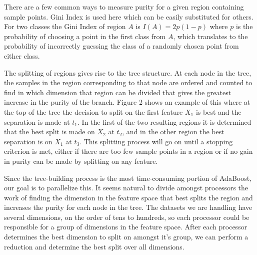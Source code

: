 \documentclass[12pt]{article}
\begin{document}
There are a few common ways to measure purity for a given region containing
sample points. Gini Index is used here which can be easily substituted for
others. For two classes the Gini Index of region $A$ is $I(A) = 2p(1-p)$ where
$p$ is the probability of choosing a point in the first class from $A$, which
translates to the probability of incorrectly guessing the class of a randomly
chosen point from either class.

The splitting of regions gives rise to the tree structure. At each node in the
tree, the samples in the region corresponding to that node are ordered and
counted to find in which dimension that region can be divided that gives the
greatest increase in the purity of the branch. Figure 2 shows an example of
this where at the top of the tree the decision to split on the first feature
$X_1$ is best and the separation is made at $t_1$. In the first of the two
resulting regions it is determined that the best split is made on $X_2$ at
$t_2$, and in the other region the best separation is on $X_1$ at $t_3$. This
splitting process will go on until a stopping criterion is met, either if there
are too few sample points in a region or if no gain in purity can be made by
splitting on any feature.


Since the tree-building process is the most time-consuming portion of AdaBoost,
our goal is to parallelize this. It seems natural to divide amongst processors
the work of finding the dimension in the feature space that best splits the
region and increases the purity for each node in the tree. The datasets we are
handling have several dimensions, on the order of tens to hundreds, so each
processor could be responsible for a group of dimensions in the feature space.
After each processor determines the best dimension to split on amongst it's
group, we can perform a reduction and determine the best split over all
dimensions.
\end{document}
